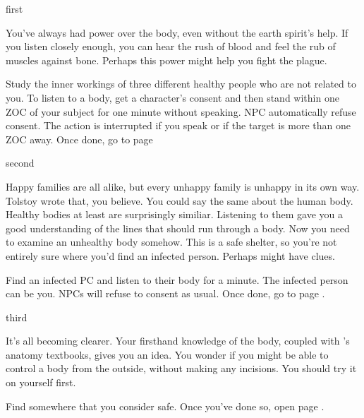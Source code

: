 \documentclass[greennotebook]{Pestilence} %
\begin{document}
\startnotebook{\nRebelLab{}}

\begin{page}{first}

You've always had power over the body, even without the earth spirit's help. If you listen closely enough, you can hear the rush of blood and feel the rub of muscles against bone. Perhaps this power might help you fight the plague. 

Study the inner workings of three different healthy people who are not related to you. To listen to a body, get a character's consent and then stand within one ZOC of your subject for one minute without speaking. NPC automatically refuse consent. The action is interrupted if you speak or if the target is more than one ZOC away. Once done, go to page 

\end{page}

\begin{page}{second}

Happy families are all alike, but every unhappy family is unhappy in its own way. Tolstoy wrote that, you believe. You could say the same about the human body. Healthy bodies at least are surprisingly similiar. Listening to them gave you a good understanding of the lines that should run through a body. Now you need to examine an unhealthy body somehow. This is a safe shelter, so you're not entirely sure where you'd find an infected person. Perhaps \cOutsider{} might have clues.

Find an infected PC and listen to their body for a minute. The infected person can be you. NPCs will refuse to consent as usual. Once done, go to page .

\end{page}

\begin{page}{third}

It's all becoming clearer. Your firsthand knowledge of the body, coupled with \cOutsider{}'s anatomy textbooks, gives you an idea. You wonder if you might be able to control a body from the outside, without making any incisions. You should try it on yourself first.

Find somewhere that you consider safe. Once you've done so, open page .

\end{page}
\end{document}
